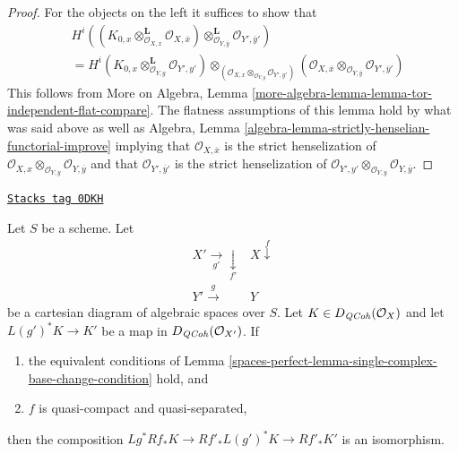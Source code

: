 \begin{proof}
For the objects on the left it suffices to show that
\begin{align*}
&
H^i\left(
(K_{0, x}
\otimes_{\mathcal{O}_{X, x}}^\mathbf{L} \mathcal{O}_{X, \overline{x}})
\otimes_{\mathcal{O}_{Y, \overline{y}}}^\mathbf{L}
\mathcal{O}_{Y', \overline{y}'}\right) \\
& =
H^i(K_{0, x} \otimes_{\mathcal{O}_{Y, y}}^\mathbf{L} \mathcal{O}_{Y', y'})
\otimes_{(\mathcal{O}_{X, x} \otimes_{\mathcal{O}_{Y, y}} \mathcal{O}_{Y', y'})}
(\mathcal{O}_{X, \overline{x}}
\otimes_{\mathcal{O}_{Y, \overline{y}}}
\mathcal{O}_{Y', \overline{y}'})
\end{align*}
This follows from More on Algebra, Lemma
\ref{more-algebra-lemma-lemma-tor-independent-flat-compare}.
The flatness assumptions of this lemma hold by what was said
above as well as Algebra, Lemma
\ref{algebra-lemma-strictly-henselian-functorial-improve}
implying that
$\mathcal{O}_{X, \overline{x}}$ is the strict henselization of
$\mathcal{O}_{X, x} \otimes_{\mathcal{O}_{Y, y}}
\mathcal{O}_{Y, \overline{y}}$
and that
$\mathcal{O}_{Y', \overline{y}'}$ is the strict henselization of
$\mathcal{O}_{Y', y'} \otimes_{\mathcal{O}_{Y, y}}
\mathcal{O}_{Y, \overline{y}}$.
\end{proof}

\begin{lemma}
\label{spaces-perfect-lemma-single-complex-base-change}
\href{https://stacks.math.columbia.edu/tag/0DKH}{\texttt{Stacks tag 0DKH}}

Let $S$ be a scheme. Let
$$
\begin{array}{cc}X' \underset{g'}{\longrightarrow}\underset{f'}{\downarrow} & X \overset{f}{\downarrow} \\ Y' \overset{g}{\longrightarrow} & Y\end{array}
$$
be a cartesian diagram of algebraic spaces over $S$.
Let $K \in D_{\mathit{QCoh}}(\mathcal{O}_X)$ and let $L(g')^*K \to K'$
be a map in $D_{\mathit{QCoh}}(\mathcal{O}_{X'})$. If
\begin{enumerate}
\item the equivalent conditions of
Lemma \ref{spaces-perfect-lemma-single-complex-base-change-condition} hold, and
\item $f$ is quasi-compact and quasi-separated,
\end{enumerate}
then the composition $Lg^*Rf_*K \to Rf'_*L(g')^*K \to Rf'_*K'$
is an isomorphism.
\end{lemma}

